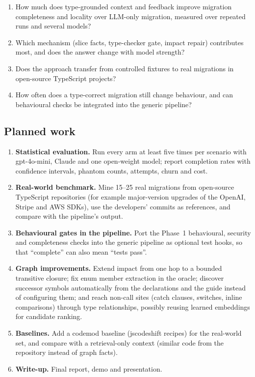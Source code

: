 \documentclass[11pt,a4paper]{article}
\begin{document}
\begin{enumerate}
  \item[\textbf{RQ1}] How much does type-grounded context and feedback improve migration
        completeness and locality over LLM-only migration, measured over repeated runs and
        several models?
  \item[\textbf{RQ2}] Which mechanism (slice facts, type-checker gate, impact repair)
        contributes most, and does the answer change with model strength?
  \item[\textbf{RQ3}] Does the approach transfer from controlled fixtures to real migrations
        in open-source TypeScript projects?
  \item[\textbf{RQ4}] How often does a type-correct migration still change behaviour, and can
        behavioural checks be integrated into the generic pipeline?
\end{enumerate}

\subsection{Planned work}

\begin{enumerate}
  \item \textbf{Statistical evaluation.} Run every arm at least five times per scenario with
        gpt-4o-mini, Claude and one open-weight model; report completion rates with confidence
        intervals, phantom counts, attempts, churn and cost.
  \item \textbf{Real-world benchmark.} Mine 15--25 real migrations from open-source TypeScript
        repositories (for example major-version upgrades of the OpenAI, Stripe and AWS SDKs),
        use the developers' commits as references, and compare with the pipeline's output.
  \item \textbf{Behavioural gates in the pipeline.} Port the Phase~1 behavioural, security
        and completeness checks into the generic pipeline as optional test hooks, so that
        ``complete'' can also mean ``tests pass''.
  \item \textbf{Graph improvements.} Extend impact from one hop to a bounded transitive
        closure; fix enum member extraction in the oracle; discover successor symbols
        automatically from the declarations and the guide instead of configuring them; and
        reach non-call sites (catch clauses, switches, inline comparisons) through type
        relationships, possibly reusing learned embeddings for candidate ranking.
  \item \textbf{Baselines.} Add a codemod baseline (jscodeshift recipes) for the real-world
        set, and compare with a retrieval-only context (similar code from the repository
        instead of graph facts).
  \item \textbf{Write-up.} Final report, demo and presentation.
\end{enumerate}
\end{document}

